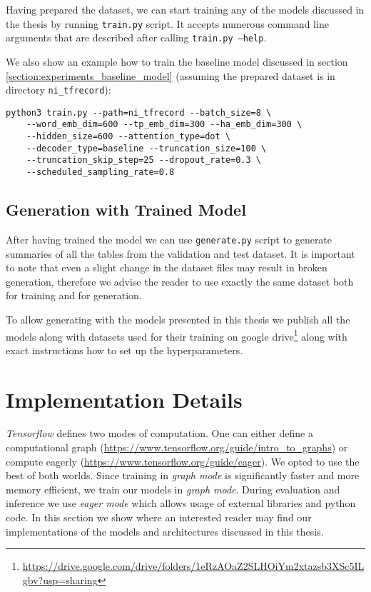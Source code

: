 Having prepared the dataset, we can start training any of the models discussed in the thesis by running \texttt{train.py} script. It accepts numerous command line arguments that are described after calling \texttt{train.py --help}.

We also show an example how to train the baseline model discussed in section \ref{section:experiments_baseline_model} (assuming the prepared dataset is in directory \texttt{ni\_tfrecord}):

\begin{verbatim}
python3 train.py --path=ni_tfrecord --batch_size=8 \
    --word_emb_dim=600 --tp_emb_dim=300 --ha_emb_dim=300 \
    --hidden_size=600 --attention_type=dot \
    --decoder_type=baseline --truncation_size=100 \
    --truncation_skip_step=25 --dropout_rate=0.3 \
    --scheduled_sampling_rate=0.8
\end{verbatim}

\subsection{Generation with Trained Model}

After having trained the model we can use \texttt{generate.py} script to generate summaries of all the tables from the validation and test dataset. It is important to note that even a slight change in the dataset files may result in broken generation, therefore we advise the reader to use exactly the same dataset both for training and for generation.

To allow generating with the models presented in this thesis we publish all the models along with datasets used for their training on google drive\footnote{\url{https://drive.google.com/drive/folders/1eRzAOaZ2SLHOiYm2xtazsb3XSc5ILgbv?usp=sharing}} along with exact instructions how to set up the hyperparameters.

\section{Implementation Details}

\emph{Tensorflow} defines two modes of computation. One can either define a computational graph (\url{https://www.tensorflow.org/guide/intro_to_graphs}) or compute eagerly (\url{https://www.tensorflow.org/guide/eager}). We opted to use the best of both worlds. Since training in \emph{graph mode} is significantly faster and more memory efficient, we train our models in \emph{graph mode}. During evaluation and inference we use \emph{eager mode} which allows usage of external libraries and python code. In this section we show where an interested reader may find our implementations of the models and architectures discussed in this thesis.

